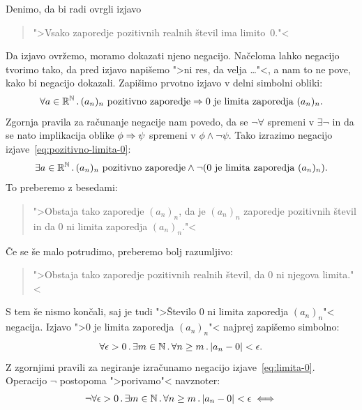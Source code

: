 \begin{zgled}
  Denimo, da bi radi ovrgli izjavo
  \begin{quote}
    ">Vsako zaporedje pozitivnih realnih števil ima limito~$0$."<
  \end{quote}
  Da izjavo ovržemo, moramo dokazati njeno negacijo. Načeloma lahko
  negacijo tvorimo tako, da pred izjavo napišemo ">ni res, da velja
  \dots"<, a nam to ne pove, kako bi negacijo dokazali. Zapišimo
  prvotno izjavo v delni simbolni obliki:
  \begin{equation}
    \label{eq:pozitivno-limita-0}
    \forall a \in \mathbb{R}^{\mathbb{N}} \,.\,{\text{$(a_n)_n$ pozitivno zaporedje}
      \Rightarrow \text{$0$ je limita zaporedja $(a_n)_n$}}.
  \end{equation}
  Zgornja pravila za računanje negacije nam povedo, da se
  $\lnot\forall$ spremeni v $\exists\lnot$ in da se nato implikacija
  oblike $\phi \Rightarrow \psi$ spremeni v $\phi \land \lnot\psi$. Tako
  izrazimo negacijo izjave~\eqref{eq:pozitivno-limita-0}:
  \begin{equation*}
    \exists a \in \mathbb{R}^{\mathbb{N}} \,.\,{\text{$(a_n)_n$ pozitivno zaporedje}
      \land \lnot (\text{$0$ je limita zaporedja $(a_n)_n$})}.
  \end{equation*}
  To preberemo z besedami:
  \begin{quote}
    ">Obstaja tako zaporedje $(a_n)_n$, da je $(a_n)_n$ zaporedje
    pozitivnih števil in da $0$ ni limita zaporedja $(a_n)_n$."<
  \end{quote}
  Če se še malo potrudimo, preberemo bolj razumljivo:
  \begin{quote}
    ">Obstaja tako zaporedje pozitivnih realnih števil, da $0$ ni
    njegova limita."<
  \end{quote}
  S tem še nismo končali, saj je tudi ">Število $0$ ni limita
  zaporedja $(a_n)_n$"< negacija. Izjavo ">$0$ je limita zaporedja
  $(a_n)_n$"< najprej zapišemo simbolno:
  \begin{equation}
    \label{eq:limita-0}
    \forall \epsilon > 0 \,.\,
      \exists m \in \mathbb{N} \,.\,
        \forall n \geq m \,.\,
          |a_n - 0| < \epsilon.
  \end{equation}
  Z zgornjimi pravili za negiranje izračunamo negacijo
  izjave~\eqref{eq:limita-0}. Operacijo $\lnot$ postopoma ">porivamo"<
  navznoter:
  \begin{align*}
    \lnot \all{\epsilon > 0} \some{m \in \NN} \all{n \geq m} |a_n
          - 0| < \epsilon & \iff
    \\

\end{align*}
\end{zgled}
